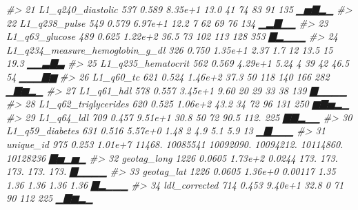 \documentclass[]{article}
\newenvironment{Shaded}{\begin{snugshade}}{\end{snugshade}}
\newcommand{\CommentTok}[1]{\textcolor[rgb]{0.56,0.35,0.01}{\textit{#1}}}
\begin{document}
\begin{Shaded}
\begin{Highlighting}[]
\CommentTok{#> 21 L1_q240_diastolic                                             537       0.589   8.35e+1     13.0           41          74          83          91         135    ▁▅▇▂▁}
\CommentTok{#> 22 L1_q238_pulse                                                 549       0.579   6.97e+1     12.2            7          62          69          76         134    ▁▂▇▁▁}
\CommentTok{#> 23 L1_q63_glucose                                                489       0.625   1.22e+2     36.5           73         102         113         128         353    ▇▂▁▁▁}
\CommentTok{#> 24 L1_q234_measure_hemoglobin_g_dl                               326       0.750   1.35e+1      2.37           1.7        12          13.5        15          19.3  ▁▁▃▇▃}
\CommentTok{#> 25 L1_q235_hematocrit                                            562       0.569   4.29e+1      5.24           4          39          42          46.5        54    ▁▁▁▇▆}
\CommentTok{#> 26 L1_q60_tc                                                     621       0.524   1.46e+2     37.3           50         118         140         166         282    ▁▇▆▂▁}
\CommentTok{#> 27 L1_q61_hdl                                                    578       0.557   3.45e+1      9.60          20          29          33          38         139    ▇▁▁▁▁}
\CommentTok{#> 28 L1_q62_triglycerides                                          620       0.525   1.06e+2     43.2           34          72          96         131         250    ▆▇▅▂▁}
\CommentTok{#> 29 L1_q64_ldl                                                    709       0.457   9.51e+1     30.8           50          72          90.5       112.        225    ▇▇▂▁▁}
\CommentTok{#> 30 L1_q59_diabetes                                               631       0.516   5.57e+0      1.48           2           4.9         5.1         5.9        13    ▁▇▁▁▁}
\CommentTok{#> 31 unique_id                                                     975       0.253   1.01e+7  11468.      10085541    10092090.   10094212.   10114860.   10128236    ▇▅▁▅▁}
\CommentTok{#> 32 geotag_long                                                  1226       0.0605  1.73e+2      0.0244       173.        173.        173.        173.        173.   ▇▁▁▁▁}
\CommentTok{#> 33 geotag_lat                                                   1226       0.0605  1.36e+0      0.00117        1.35        1.36        1.36        1.36        1.36 ▇▂▁▁▁}
\CommentTok{#> 34 ldl_corrected                                                 714       0.453   9.40e+1     32.8            0          71          90         112         225    ▁▇▆▂▁}

\end{Highlighting}
\end{Shaded}
\end{document}
